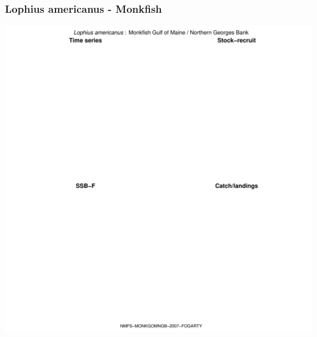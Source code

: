 \subsubsection{Lophius americanus - Monkfish}
\begin{center}
\includegraphics[width=1.2\textwidth]{../R/figures/NMFS-MONKGOMNGB-2007-FOGARTY.pdf}
\end{center}

